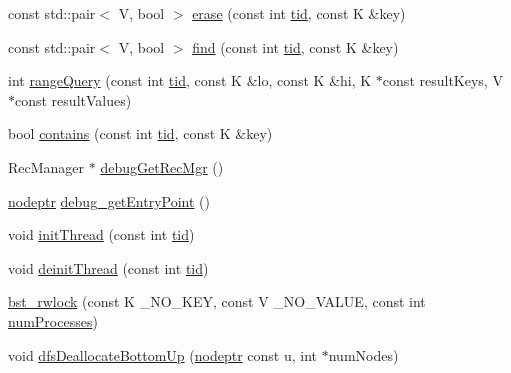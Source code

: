\begin{DoxyCompactItemize}
\item 
const std\+::pair$<$ V, bool $>$ \hyperlink{classbst__rwlock__ns_1_1bst__rwlock_adbd4f85a6156fb035252641a49d597e8}{erase} (const int \hyperlink{microbench_2main_8cpp_a9ca9869868fe7e7a38a921cc7de4103f}{tid}, const K \&key)
\item 
const std\+::pair$<$ V, bool $>$ \hyperlink{classbst__rwlock__ns_1_1bst__rwlock_a90792997449ce93f586d3fef497e021c}{find} (const int \hyperlink{microbench_2main_8cpp_a9ca9869868fe7e7a38a921cc7de4103f}{tid}, const K \&key)
\item 
int \hyperlink{classbst__rwlock__ns_1_1bst__rwlock_a6ae6dae5dfb3dc230566bb5be9b9196b}{range\+Query} (const int \hyperlink{microbench_2main_8cpp_a9ca9869868fe7e7a38a921cc7de4103f}{tid}, const K \&lo, const K \&hi, K $\ast$const result\+Keys, V $\ast$const result\+Values)
\item 
bool \hyperlink{classbst__rwlock__ns_1_1bst__rwlock_ade66bdd27e466ccfcda067ebc139f2e8}{contains} (const int \hyperlink{microbench_2main_8cpp_a9ca9869868fe7e7a38a921cc7de4103f}{tid}, const K \&key)
\item 
Rec\+Manager $\ast$ \hyperlink{classbst__rwlock__ns_1_1bst__rwlock_a824bdfe03d587f211c4454b06b1268ed}{debug\+Get\+Rec\+Mgr} ()
\item 
\hyperlink{bst__rwlock__impl_8h_a04158d2a20768fe447133ff555823b05}{nodeptr} \hyperlink{classbst__rwlock__ns_1_1bst__rwlock_a63f6ecffb9692643fef6cfd07d51bae3}{debug\+\_\+get\+Entry\+Point} ()
\item 
void \hyperlink{classbst__rwlock__ns_1_1bst__rwlock_a786c88e4bafec7d09dc5f37a43d01aa1}{init\+Thread} (const int \hyperlink{microbench_2main_8cpp_a9ca9869868fe7e7a38a921cc7de4103f}{tid})
\item 
void \hyperlink{classbst__rwlock__ns_1_1bst__rwlock_aea88265b9703e71e6d1ee91814163fd8}{deinit\+Thread} (const int \hyperlink{microbench_2main_8cpp_a9ca9869868fe7e7a38a921cc7de4103f}{tid})
\item 
\hyperlink{classbst__rwlock__ns_1_1bst__rwlock_a8d8cc1557bc6491508dcfacaf12c9db1}{bst\+\_\+rwlock} (const K \+\_\+\+N\+O\+\_\+\+K\+EY, const V \+\_\+\+N\+O\+\_\+\+V\+A\+L\+UE, const int \hyperlink{testing_8cpp_aa085812188e21ede75351d88b9b2c30d}{num\+Processes})
\item 
void \hyperlink{classbst__rwlock__ns_1_1bst__rwlock_aa22ceca1ce1afc2b9b7a362fd779ff3a}{dfs\+Deallocate\+Bottom\+Up} (\hyperlink{bst__rwlock__impl_8h_a04158d2a20768fe447133ff555823b05}{nodeptr} const u, int $\ast$num\+Nodes)
\item 

\end{DoxyCompactItemize}
